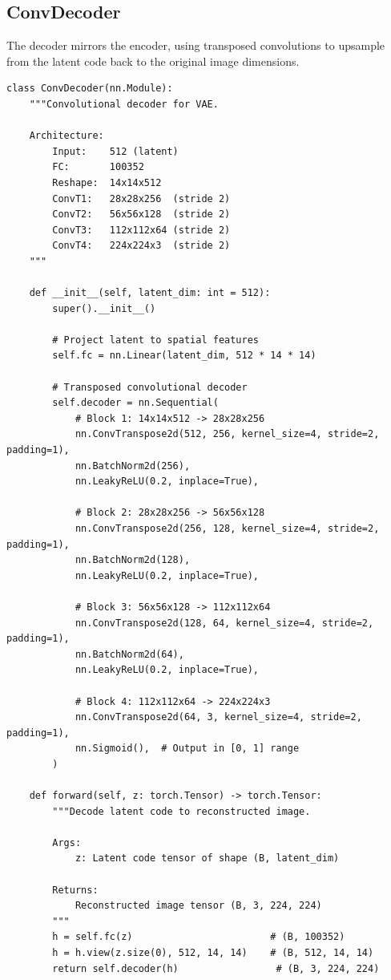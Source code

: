 \documentclass[11pt,a4paper]{article}
\begin{document}
\subsection{ConvDecoder}

The decoder mirrors the encoder, using transposed convolutions to upsample from the latent code back to the original image dimensions.

\begin{lstlisting}[caption={src/conv\_vae.py - ConvDecoder}, label={lst:convdecoder}]
class ConvDecoder(nn.Module):
    """Convolutional decoder for VAE.

    Architecture:
        Input:    512 (latent)
        FC:       100352
        Reshape:  14x14x512
        ConvT1:   28x28x256  (stride 2)
        ConvT2:   56x56x128  (stride 2)
        ConvT3:   112x112x64 (stride 2)
        ConvT4:   224x224x3  (stride 2)
    """

    def __init__(self, latent_dim: int = 512):
        super().__init__()

        # Project latent to spatial features
        self.fc = nn.Linear(latent_dim, 512 * 14 * 14)

        # Transposed convolutional decoder
        self.decoder = nn.Sequential(
            # Block 1: 14x14x512 -> 28x28x256
            nn.ConvTranspose2d(512, 256, kernel_size=4, stride=2, padding=1),
            nn.BatchNorm2d(256),
            nn.LeakyReLU(0.2, inplace=True),

            # Block 2: 28x28x256 -> 56x56x128
            nn.ConvTranspose2d(256, 128, kernel_size=4, stride=2, padding=1),
            nn.BatchNorm2d(128),
            nn.LeakyReLU(0.2, inplace=True),

            # Block 3: 56x56x128 -> 112x112x64
            nn.ConvTranspose2d(128, 64, kernel_size=4, stride=2, padding=1),
            nn.BatchNorm2d(64),
            nn.LeakyReLU(0.2, inplace=True),

            # Block 4: 112x112x64 -> 224x224x3
            nn.ConvTranspose2d(64, 3, kernel_size=4, stride=2, padding=1),
            nn.Sigmoid(),  # Output in [0, 1] range
        )

    def forward(self, z: torch.Tensor) -> torch.Tensor:
        """Decode latent code to reconstructed image.

        Args:
            z: Latent code tensor of shape (B, latent_dim)

        Returns:
            Reconstructed image tensor (B, 3, 224, 224)
        """
        h = self.fc(z)                        # (B, 100352)
        h = h.view(z.size(0), 512, 14, 14)    # (B, 512, 14, 14)
        return self.decoder(h)                 # (B, 3, 224, 224)
\end{lstlisting}
\end{document}
